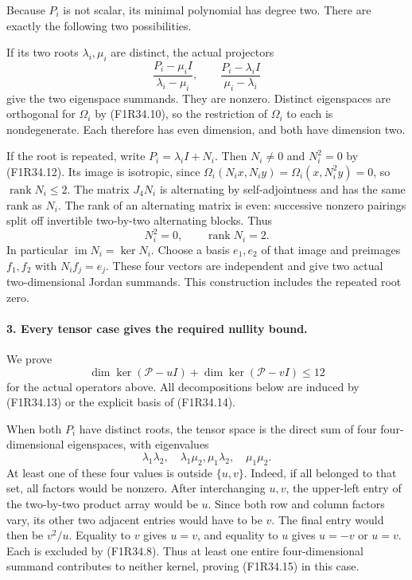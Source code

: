 Because $P_i$ is not scalar, its
minimal polynomial has degree two.
There are exactly the following
two possibilities.

If its two roots $\lambda_i,\mu_i$
are distinct, the actual projectors
\[
     \frac{P_i-\mu_i I}{\lambda_i-\mu_i},\qquad
     \frac{P_i-\lambda_i I}{\mu_i-\lambda_i}
 \tag{F1R34.13}
\]
give the two eigenspace summands.
They are nonzero. Distinct
eigenspaces are orthogonal for
$\Omega_i$ by (F1R34.10), so the
restriction of $\Omega_i$ to each
is nondegenerate. Each therefore
has even dimension, and both
have dimension two.

If the root is repeated, write
$P_i=\lambda_i I+N_i$.
Then $N_i\ne0$ and $N_i^2=0$
by (F1R34.12). Its image is
isotropic, since
$\Omega_i(N_i x,N_i y)=\Omega_i(x,N_i^2y)=0$,
so $\operatorname{rank}N_i\le2$.
The matrix $J_4N_i$ is alternating
by self-adjointness and has the
same rank as $N_i$. The rank of
an alternating matrix is even:
successive nonzero pairings split
off invertible two-by-two alternating
blocks. Thus
\[
                      N_i^2=0,\qquad \operatorname{rank}N_i=2.
 \tag{F1R34.14}
\]
In particular $\operatorname{im}N_i=
\ker N_i$. Choose a basis $e_1,e_2$
of that image and preimages $f_1,f_2$
with $N_i f_j=e_j$. These four
vectors are independent and give
two actual two-dimensional Jordan
summands. This construction includes
the repeated root zero.

\paragraph{3. Every tensor case gives the required nullity bound.}
We prove
\[
       \dim\ker(\mathcal P-uI)
          +\dim\ker(\mathcal P-vI)\le12
 \tag{F1R34.15}
\]
for the actual operators above.
All decompositions below are induced
by (F1R34.13) or the explicit
basis of (F1R34.14).

When both $P_i$ have distinct roots,
the tensor space is the direct sum
of four four-dimensional eigenspaces,
with eigenvalues
\[
       \lambda_1\lambda_2,\quad\lambda_1\mu_2,
                     \mu_1\lambda_2,\quad\mu_1\mu_2.
 \tag{F1R34.16}
\]
At least one of these four values
is outside $\{u,v\}$. Indeed, if
all belonged to that set, all
factors would be nonzero. After
interchanging $u,v$, the upper-left
entry of the two-by-two product
array would be $u$. Since both
row and column factors vary, its
other two adjacent entries would
have to be $v$. The final entry
would then be $v^2/u$. Equality
to $v$ gives $u=v$, and equality
to $u$ gives $u=-v$ or $u=v$.
Each is excluded by (F1R34.8).
Thus at least one entire
four-dimensional summand contributes
to neither kernel, proving
(F1R34.15) in this case.

